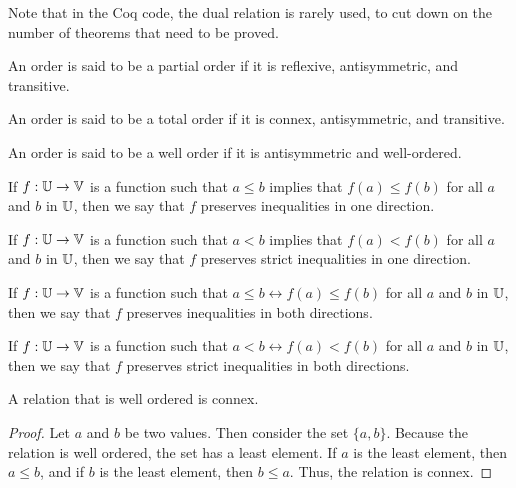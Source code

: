 \documentclass[../math.tex]{subfiles}
\begin{document}
Note that in the Coq code, the dual relation is rarely used, to cut down on the
number of theorems that need to be proved.

\begin{class}
    An order is said to be a partial order if it is reflexive, antisymmetric,
    and transitive.
\end{class}

\begin{class}
    An order is said to be a total order if it is connex, antisymmetric, and
    transitive.
\end{class}

\begin{class}
    An order is said to be a well order if it is antisymmetric and well-ordered.
\end{class}

\begin{class}
    If $f : \mathbb{U} \to \mathbb{V}$ is a function such that $a \leq b$ implies that $f(a)
    \leq f(b)$ for all $a$ and $b$ in $\mathbb{U}$, then we say that $f$ preserves
    inequalities in one direction.
\end{class}

\begin{class}
    If $f : \mathbb{U} \to \mathbb{V}$ is a function such that $a < b$ implies that $f(a) <
    f(b)$ for all $a$ and $b$ in $\mathbb{U}$, then we say that $f$ preserves strict
    inequalities in one direction.
\end{class}

\begin{class}
    If $f : \mathbb{U} \to \mathbb{V}$ is a function such that $a \leq b \leftrightarrow f(a)
    \leq f(b)$ for all $a$ and $b$ in $\mathbb{U}$, then we say that $f$ preserves
    inequalities in both directions.
\end{class}

\begin{class}
    If $f : \mathbb{U} \to \mathbb{V}$ is a function such that $a < b \leftrightarrow f(a) <
    f(b)$ for all $a$ and $b$ in $\mathbb{U}$, then we say that $f$ preserves strict
    inequalities in both directions.
\end{class}

\begin{instance} \label{wo_connex}
    A relation that is well ordered is connex.
\end{instance}
\begin{proof}
    Let $a$ and $b$ be two values.  Then consider the set $\{a, b\}$.  Because
    the relation is well ordered, the set has a least element.  If $a$ is the
    least element, then $a \leq b$, and if $b$ is the least element, then $b
    \leq a$.  Thus, the relation is connex.
\end{proof}
\end{document}
